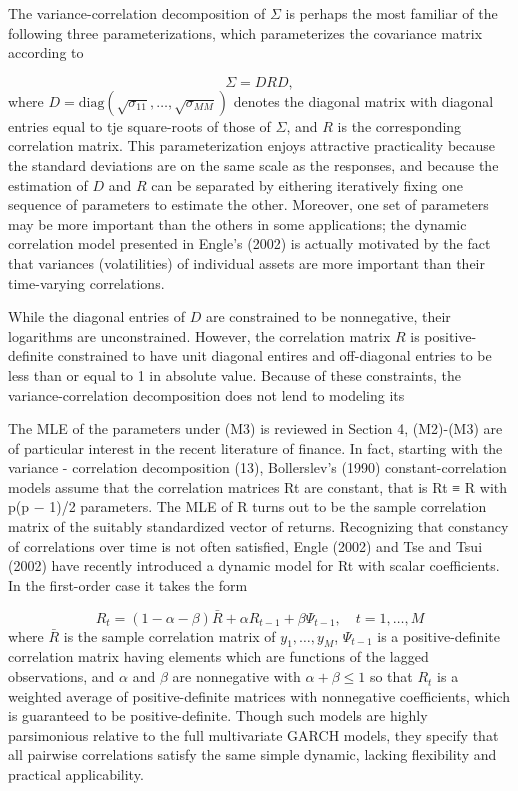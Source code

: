 The variance-correlation decomposition of $\Sigma$ is perhaps the most familiar of the following three parameterizations, which parameterizes the covariance matrix according to

\begin{equation}\label{eq:}
\Sigma = DRD,
\end{equation}
\noindent
where $D = \mbox{diag}\left(\sqrt{\sigma_{11}},\dots , \sqrt{\sigma_{MM}}\right)$ denotes the diagonal matrix with diagonal entries equal to tje square-roots of those of $\Sigma$, and $R$ is the corresponding correlation matrix. This parameterization enjoys attractive practicality because the standard deviations are on the same scale as the responses, and because the estimation of $D$ and $R$ can be separated by eithering iteratively fixing one sequence of parameters to estimate the other. Moreover, one set of parameters may be more important than the others in some applications; the dynamic correlation model presented in  Engle’s (2002) is actually motivated by the fact that variances (volatilities) of individual assets are more important than their time-varying correlations.
\bigskip

While the diagonal entries of $D$ are constrained to be nonnegative, their logarithms are unconstrained. However, the correlation matrix $R$ is positive-definite constrained to have unit diagonal entires and off-diagonal entries to be less than or equal to 1 in absolute value. Because of these constraints, the variance-correlation decomposition does not lend to modeling its

\bigskip
The MLE of the parameters under (M3) is reviewed in Section 4, (M2)-(M3) are of particular interest in the recent literature of finance. In fact, starting with the variance - correlation
decomposition (13), Bollerslev’s (1990) constant-correlation models assume that the correlation matrices {Rt} are constant, that is Rt ≡ R with p(p − 1)/2 parameters. The MLE
of R turns out to be the sample correlation matrix of the suitably standardized vector of returns. Recognizing that constancy of correlations over time is not often satisfied, Engle
(2002) and Tse and Tsui (2002) have recently introduced a dynamic model for {Rt} with scalar coefficients. In the first-order case it takes the form

\begin{equation}
R_t = \left(1 - \alpha - \beta\right)\bar{R} + \alpha R_{t-1}+ \beta\Psi_{t-1}, \quad t = 1,\dots, M
\end{equation}
\noindent
where $\bar{R}$ is the sample correlation matrix of $y_1, \dots ,y_M$, $\Psi_{t-1}$ is a positive-definite correlation matrix having elements which are functions of the lagged observations, and $\alpha$ and $\beta$ are nonnegative with $\alpha+\beta \le 1$ so that $R_t$ is a weighted average of positive-definite matrices with nonnegative coefficients, which is guaranteed to be positive-definite. Though such models are highly parsimonious relative to the full multivariate GARCH models, they specify that all pairwise correlations satisfy the same simple dynamic, lacking flexibility and practical applicability.
